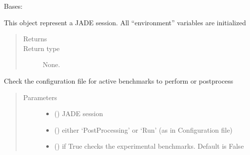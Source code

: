 \documentclass[letterpaper,10pt,english]{sphinxmanual}
\begin{document}
\begin{fulllineitems}
\label{\detokenize{api/initobjects:main.Session}}
Bases: 

This object represent a JADE session. All “environment” variables are
initialized
\begin{quote}\begin{description}
\item[{Returns}] \leavevmode


\item[{Return type}] \leavevmode
None.

\end{description}\end{quote}

\begin{fulllineitems}
\label{\detokenize{api/initobjects:main.Session.check_active_tests}}
Check the configuration file for active benchmarks to perform or
post\sphinxhyphen{}process
\begin{quote}\begin{description}
\item[{Parameters}] \leavevmode\begin{itemize}
\item {} 
 ({\hyperref[\detokenize{api/initobjects:main.Session}]{}}) \textendash{} JADE session

\item {} 
 () \textendash{} either ‘Post\sphinxhyphen{}Processing’ or ‘Run’ (as in Configuration file)

\item {} 
 () \textendash{} if True checks the experimental benchmarks. Default is False

\end{itemize}


\end{description}
\end{quote}
\end{fulllineitems}
\end{fulllineitems}
\end{document}
